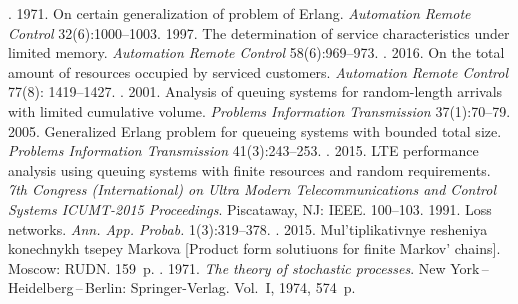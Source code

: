 
  \begin{multicols}{2}

\renewcommand{\bibname}{\protect\rmfamily References}

{\small\frenchspacing
 {%
 \begin{thebibliography}{9}


. 1971. On certain generalization of problem of Erlang. 
\textit{Automation Remote Control} 32(6):1000--1003.
 1997. The determination of service characteristics under limited memory. 
\textit{Automation Remote Control} 58(6):969--973.
. 2016. On the total amount of resources 
occupied by serviced customers. \textit{Automation Remote Control} 77(8): 1419--1427.
. 2001. Analysis of queuing systems for random-length 
arrivals with limited cumulative volume. \textit{Problems Information Transmission}  
37(1):70--79.
 2005. Generalized Erlang problem for queueing systems with bounded total 
size. \textit{Problems Information Transmission} 41(3):243--253.
. 2015. 
LTE performance analysis using queuing systems with finite resources and random requirements. 
\textit{7th  Congress (International) on Ultra Modern Telecommunications and Control Systems 
ICUMT-2015 Proceedings}. Piscataway, NJ: IEEE. 100--103.
 1991. Loss networks. \textit{Ann. App. Probab.} 1(3):319--378.
. 2015. Mul'tiplikativnye resheniya 
konechnykh tsepey Markova [Product form solutiuons for finite Markov' chains]. Moscow: RUDN. 
159~p.
. 1971. \textit{The theory of stochastic processes}. New  
York\,--\,Heidelberg\,--\,Berlin: Springer-Verlag. Vol.~I, 1974, 574~p. 
   \end{thebibliography}

 }
 }

\end{multicols}

\vspace*{-9pt}

